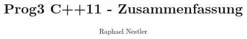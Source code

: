 \documentclass[ngerman,english]{scrartcl}
\title{Prog3 C++11 - Zusammenfassung}
\author{Raphael Nestler}
\date{\revisiondate ~ \revision ~ \revisionmodified}
\begin{document}
 
\twocolumn









\onecolumn

 
\end{document}

